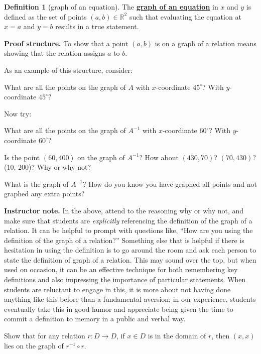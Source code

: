 \documentclass[11pt]{article}
\newcommand\smallnote[1]
	{\begin{mdframed}\raggedright  {\bf Instructor note.} {#1} \end{mdframed}}
\newenvironment{task}
	{\begin{mdframed}[linecolor=lightgray, linewidth=3pt]\raggedright}
	{\end{mdframed}}
\newcommand{\R}{\mathbb{R}}
\newcommand\degrees{^\circ}
\renewcommand\emph[1]{\underline{\bf{#1}}} %
\theoremstyle{definition}
\newtheorem{definition}[theorem]{Definition}
\begin{document}
\begin{definition}[graph of an equation]\label{d: graph of an equation}
The \emph{graph of an equation} in $x$ and $y$ is defined as the set of points $(a, b) \in \R^2$ such that evaluating the equation at $x=a$ and $y=b$ results in a true statement.
\end{definition}

{\bf Proof structure.}
To show that a point $(a, b)$ is on a graph of a relation means showing that the relation assigns $a$ to $b$.

As an example of this structure, consider:
\begin{task}
What are all the points on the graph of $A$ with $x$-coordinate $45\degrees$? With $y$-coordinate $45\degrees$?
\end{task}

Now try:

\vspace*{-4pt}
\begin{task}
What are all the points on the graph of $A^{-1}$ with $x$-coordinate $60\degrees$? With $y$-coordinate $60\degrees$?
 
Is the point $(60, 400)$ on the graph of $A^{-1}$? How about $(430, 70)$? $(70, 430)$? (10, 200)? Why or why not?
  
What is the graph of $A^{-1}$? How do you know you have graphed all points and not graphed any extra points?
\end{task}

\vspace*{-10pt}
\smallnote{In the above, attend to the reasoning why or why not, and make sure that students are {\it explicitly} referencing the definition of the graph of a relation. It can be helpful to prompt with questions like, ``How are you using the definition of the graph of a relation?'' Something else that is helpful if there is hesitation in using the definition is to go around the room and ask each person to state the definition of graph of a relation. This may sound over the top, but when used on occasion, it can be an effective technique for both remembering key definitions and also impressing the importance of particular statements. When students are reluctant to engage in this, it is more about not having done anything like this before than a fundamental aversion; in our experience, students eventually take this in good humor and appreciate being given the time to commit a definition to memory in a public and verbal way.}


\begin{task}
Show that for any relation $r:D\to D$, if $x\in D$ is in the domain of $r$, then $(x,x)$ lies on the graph of $r^{-1}\circ r$. 
\end{task}
\end{document}

